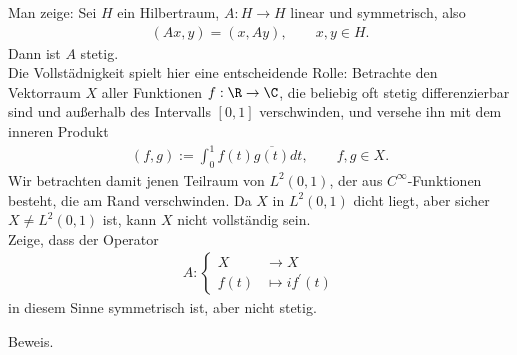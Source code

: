 \begin{exercise}
Man zeige: Sei $H$ ein Hilbertraum, $A: H \to H$ linear und symmetrisch, also
\begin{align*}
  (Ax,y) = (x,Ay), \qquad x,y \in H.
\end{align*}
Dann ist $A$ stetig. \\
Die Vollstädnigkeit spielt hier eine entscheidende Rolle: Betrachte den Vektorraum $X$
aller Funktionen $f: \R \to \C$, die beliebig oft stetig differenzierbar sind und
außerhalb des Intervalls $[0,1]$ verschwinden, und versehe ihn mit dem inneren Produkt
\begin{align*}
  (f,g) := \int_0^1 f(t)\overline{g(t)}dt, \qquad f,g \in X.
\end{align*}
Wir betrachten damit jenen Teilraum von $L^2(0,1)$, der aus $C^{\infty}$-Funktionen
besteht, die am Rand verschwinden. Da $X$ in $L^2(0,1)$ dicht liegt, aber sicher
$X \neq L^2(0,1)$ ist, kann $X$ nicht vollständig sein. \\
Zeige, dass der Operator
\begin{align*}
  A: \begin{cases}
    X &\to X \\
    f(t) &\mapsto if^{\prime}(t)
  \end{cases}
\end{align*}
in diesem Sinne symmetrisch ist, aber nicht stetig.
\end{exercise}
\begin{solution}
Beweis.
\end{solution}
